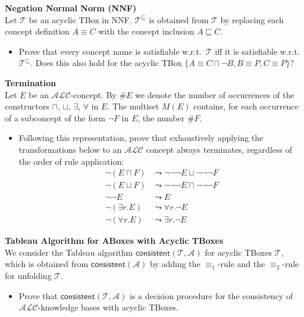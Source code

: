 \documentclass[12pt,a4paper]{article}
\newcommand{\alc}{$\mathcal{ALC}$\xspace}
\newenvironment{problem}[2][{\color{red}Question}]{\begin{trivlist}
\item[\hskip \labelsep {\bfseries #1}\hskip \labelsep {\bfseries #2.}]}{\end{trivlist}}
\begin{document}
\begin{problem}{{\color{red}3}}
\textbf{Negation Normal Norm (NNF)}\\
Let $\mathcal{T}$ be an acyclic TBox in NNF. $\mathcal{T}^{\sqsubseteq}$ is obtained from $\mathcal{T}$ by replacing each concept definition $A\equiv C$ with the concept inclusion $A\sqsubseteq C$.

\begin{itemize}
\item[-] Prove that every concept name is satisfiable w.r.t.\ $\mathcal{T}$ iff it is satisfiable w.r.t.\ $\mathcal{T}^{\sqsubseteq}$. Does this also hold for the acyclic TBox $\{A\equiv C\sqcap\neg B, B\equiv P, C\equiv P\}$?
\end{itemize}

\end{problem}


\begin{problem}{{\color{red}4}}
\textbf{Termination}\\
Let $E$ be an \alc-concept. By $\#E$ we denote the number of occurrences of the constructors $\sqcap$, $\sqcup$, $\exists$, $\forall$ in $E$. The multiset $M(E)$ contains, for each occurrence of a subconcept of the form $\neg F$ in $E$, the number $\#F$.

\begin{itemize}
\item[-] Following this representation, prove that exhaustively applying the transformations below to an \alc concept always terminates, regardless of the order of rule application:
\begin{align*}
\neg(E\sqcap F)&\leadsto\neg\neg\neg E\sqcup\neg\neg\neg F\\
\neg(E\sqcup F)&\leadsto\neg\neg\neg E\sqcap\neg\neg\neg F\\
\neg\neg E&\leadsto E\\
\neg(\exists r.E)&\leadsto\forall r.\neg E\\
\neg(\forall r.E)&\leadsto\exists r.\neg E
\end{align*}
\end{itemize}
\end{problem}


\begin{problem}{{\color{red}5}}
\textbf{Tableau Algorithm for ABoxes with Acyclic TBoxes}\\
We consider the Tableau algorithm $\textsf{consistent}(\mathcal{T},\mathcal{A})$ for acyclic TBoxes $\mathcal{T}$, which is obtained from $\textsf{consistent}(\mathcal{A})$ by adding the $\equiv_{1}$-rule and the $\equiv_{2}$-rule for unfolding $\mathcal{T}$.
\begin{itemize}
\item[-] Prove that $\textsf{consistent}(\mathcal{T},\mathcal{A})$ is a decision procedure for the consistency of $\mathcal{ALC}$-knowledge bases with acyclic TBoxes.
\end{itemize}
\end{problem}
\end{document}
